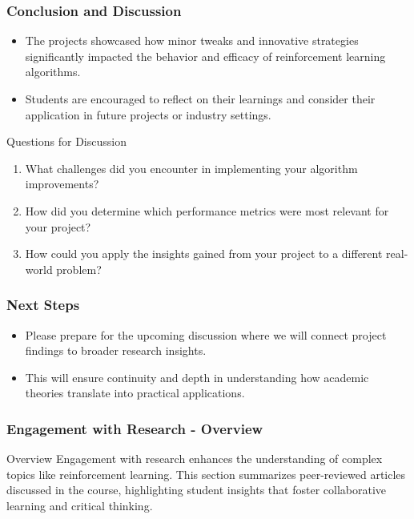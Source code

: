 \documentclass[aspectratio=169]{beamer}
\begin{document}
\begin{frame}[fragile]
    \frametitle{Conclusion and Discussion}
    \begin{itemize}
        \item The projects showcased how minor tweaks and innovative strategies significantly impacted the behavior and efficacy of reinforcement learning algorithms.
        \item Students are encouraged to reflect on their learnings and consider their application in future projects or industry settings.
    \end{itemize}
    
    \begin{block}{Questions for Discussion}
        \begin{enumerate}
            \item What challenges did you encounter in implementing your algorithm improvements?
            \item How did you determine which performance metrics were most relevant for your project?
            \item How could you apply the insights gained from your project to a different real-world problem?
        \end{enumerate}
    \end{block}
\end{frame}

\begin{frame}[fragile]
    \frametitle{Next Steps}
    \begin{itemize}
        \item Please prepare for the upcoming discussion where we will connect project findings to broader research insights.
        \item This will ensure continuity and depth in understanding how academic theories translate into practical applications.
    \end{itemize}
\end{frame}

\begin{frame}[fragile]
    \frametitle{Engagement with Research - Overview}
    \begin{block}{Overview}
        Engagement with research enhances the understanding of complex topics like reinforcement learning. This section summarizes peer-reviewed articles discussed in the course, highlighting student insights that foster collaborative learning and critical thinking.
    \end{block}
\end{frame}
\end{document}

